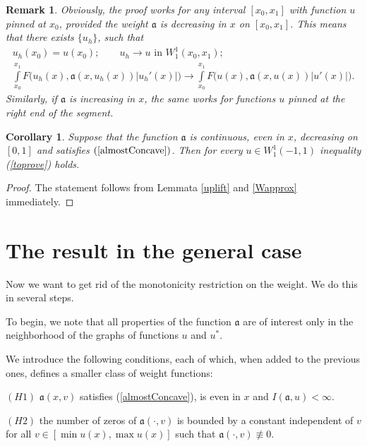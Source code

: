 \documentclass[12pt]{article}
\newcommand{\abs}[1]{\left\vert#1\right\vert}
\newtheorem{rem}{Remark}
\newtheorem{cor}{Corollary}
\newcommand{\W}{W_1^1}
\begin{document}
\begin{rem}
Obviously, the proof works for any interval $[x_0, x_1]$ with function $u$ pinned at $x_0$,
provided the weight $\mathfrak a$ is decreasing in $x$ on $[x_0, x_1]$.
This means that there exists $\{u_h\}$, such that
\begin{gather*}
u_h(x_0) = u(x_0); \qquad u_h \to u \text{ in } \W(x_0, x_1);\\
\int\limits_{x_0}^{x_1} F\big( u_h(x), \mathfrak a(x, u_h(x)) \abs{u_h'(x)} \big) \to \int\limits_{x_0}^{x_1} F\big( u(x), \mathfrak a(x, u(x)) \abs{u'(x)} \big).
\end{gather*}
Similarly, if $\mathfrak a$ is increasing in $x$, the same works for functions $u$ pinned at the right end of the segment.
\end{rem}

\begin{cor}
Suppose that the function $\mathfrak a$ is continuous, even in $x$, decreasing on $[0, 1]$ and satisfies $(\ref{almostConcave})$.
Then for every $u \in \W(-1, 1)$ inequality (\ref{toprove}) holds.
\end{cor}

\begin{proof}
The statement follows from Lemmata \ref{uplift} and \ref{Wapprox} immediately.
\end{proof}


\section{The result in the general case}
\label{moveForth}

Now we want to get rid of the monotonicity restriction on the weight.
We do this in several steps.

To begin, we note that all properties of the function $\mathfrak a$ are of interest
only in the neighborhood of the graphs of functions $u$ and $u^*$.

We introduce the following conditions, each of which, when added to the previous ones, defines a smaller class of weight functions:

\bigskip

\smallskip
\noindent
$(H1)$ $\mathfrak a(x, v)$ satisfies (\ref{almostConcave}), is even in $x$ and $I(\mathfrak a, u) < \infty$.
\smallskip

\bigskip
\noindent
$(H2)$ the number of zeros of $\mathfrak a(\cdot, v)$ is bounded by a constant independent of $v$
for all $v \in [\min u(x), \max u(x)]$ such that $\mathfrak a(\cdot, v) \not \equiv 0$.
\end{document}
